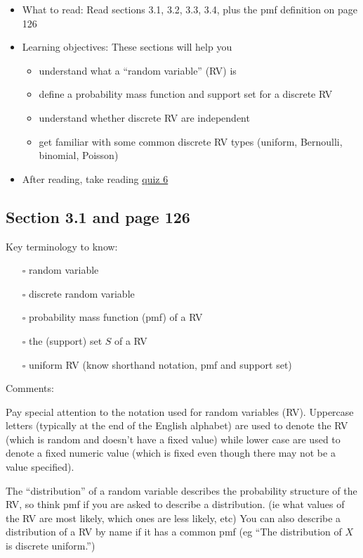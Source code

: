 \documentclass[
  letterpaper,
]{scrbook}
\providecommand{\tightlist}{%
  \setlength{\itemsep}{0pt}\setlength{\parskip}{0pt}}\usepackage{longtable,booktabs,array}
\begin{document}
\begin{itemize}
\item
  What to read: Read sections 3.1, 3.2, 3.3, 3.4, plus the pmf
  definition on page 126
\item
  Learning objectives: These sections will help you

  \begin{itemize}
  \tightlist
  \item
    understand what a ``random variable'' (RV) is
  \item
    define a probability mass function and support set for a discrete RV
  \item
    understand whether discrete RV are independent
  \item
    get familiar with some common discrete RV types (uniform, Bernoulli,
    binomial, Poisson)
  \end{itemize}
\item
  After reading, take reading
  \href{https://forms.gle/gMDmvhPHPysXiPkK8}{quiz 6}
\end{itemize}

\subsection*{Section 3.1 and page 126}\label{section-3.1-and-page-126}

Key terminology to know:

\begin{itemize}
\tightlist
\item[$\square$]
  random variable
\item[$\square$]
  discrete random variable
\item[$\square$]
  probability mass function (pmf) of a RV
\item[$\square$]
  the (support) set \(S\) of a RV
\item[$\square$]
  uniform RV (know shorthand notation, pmf and support set)
\end{itemize}

Comments:

Pay special attention to the notation used for random variables (RV).
Uppercase letters (typically at the end of the English alphabet) are
used to denote the RV (which is random and doesn't have a fixed value)
while lower case are used to denote a fixed numeric value (which is
fixed even though there may not be a value specified).

The ``distribution'' of a random variable describes the probability
structure of the RV, so think pmf if you are asked to describe a
distribution. (ie what values of the RV are most likely, which ones are
less likely, etc) You can also describe a distribution of a RV by name
if it has a common pmf (eg ``The distribution of \(X\) is discrete
uniform.'')
\end{document}
